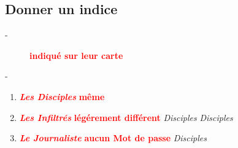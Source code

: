 \documentclass{article}%
\begin{document}
%
\subsection{ Donner un indice
}%
\label{subsec:Donnerunindice}%
\begin{description}%
\item[{-} ]%
%
\textcolor{red}{%
\textbf{indiqué sur leur carte}%
}%
\item[{-} ]%
%
\end{description}%
\begin{enumerate}%
\item%
%
\textcolor{red}{\textbf{\textit{Les Disciples}}}%
\textit{ }%
\textcolor{red}{%
\textbf{même}%
}%
\textit{ }%
\item%
%
\textcolor{red}{\textbf{\textit{Les Infiltrés}}}%
\textit{ }%
\textcolor{red}{%
\textbf{légérement différent}%
}%
\textit{ }%
\textit{Disciples}%
\textit{Disciples}%
\item%
%
\textcolor{red}{\textbf{\textit{Le Journaliste}}}%
\textit{ }%
\textcolor{red}{%
\textbf{aucun Mot de passe}%
}%
\textit{Disciples}%
\end{enumerate}

%
\end{document}
